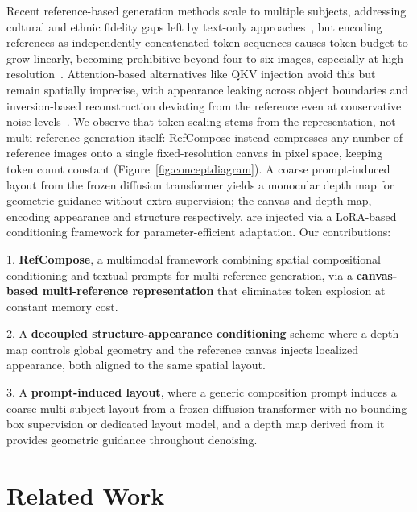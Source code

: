 \documentclass[runningheads]{llncs}
\begin{document}
Recent reference-based generation methods scale to multiple subjects, addressing cultural and ethnic fidelity gaps left by text-only approaches~\cite{wu2025uno,he2025dreamo,xiao2024omnigen,omnigen2_2025,wang2024instantid,li2024photomaker}, but encoding references as independently concatenated token sequences causes token budget to grow linearly, becoming prohibitive beyond four to six images, especially at high resolution~\cite{ye2023ip,wu2025uno,xverse2024,xiao2024omnigen,omnigen2_2025}. Attention-based alternatives like QKV injection avoid this but remain spatially imprecise, with appearance leaking across object boundaries and inversion-based reconstruction deviating from the reference even at conservative noise levels~\cite{hertz2022prompt,mokady2023null,tumanyan2023plug}. We observe that token-scaling stems from the representation, not multi-reference generation itself: RefCompose instead compresses any number of reference images onto a single fixed-resolution canvas in pixel space, keeping token count constant (Figure~\ref{fig:conceptdiagram}). A coarse prompt-induced layout from the frozen diffusion transformer yields a monocular depth map for geometric guidance without extra supervision; the canvas and depth map, encoding appearance and structure respectively, are injected via a LoRA-based conditioning framework for parameter-efficient adaptation. Our contributions:

1. \textbf{RefCompose}, a multimodal framework combining spatial compositional conditioning and textual prompts for multi-reference generation, via a \textbf{canvas-based multi-reference representation} that eliminates token explosion at constant memory cost.

2. A \textbf{decoupled structure-appearance conditioning} scheme where a depth map controls global geometry and the reference canvas injects localized appearance, both aligned to the same spatial layout.

3. A \textbf{prompt-induced layout}, where a generic composition prompt induces a coarse multi-subject layout from a frozen diffusion transformer with no bounding-box supervision or dedicated layout model, and a depth map derived from it provides geometric guidance throughout denoising.

\section{Related Work}
\label{sec:related}
\end{document}
